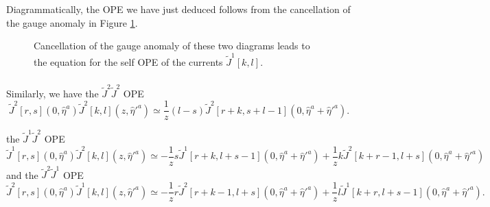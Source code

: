 \documentclass[11pt]{amsart}
\newcommand{\what}{\widehat}
\newcommand{\til}{\widetilde}
\theoremstyle{thm}
\numberwithin{equation}{subsection}
\theoremstyle{def}
\theoremstyle{rem}
\begin{document}
Diagrammatically, the OPE we have just deduced follows from the cancellation of the gauge anomaly in Figure \ref{fig:JJcancel}.


\begin{figure}
	\caption{Cancellation of the gauge anomaly of these two diagrams leads to the equation for the self OPE of the currents $\til{J}^1[k,l]$. \label{fig:JJcancel}}
\end{figure}

\subsubsection{}

Similarly, we have the $\til{J}^2 \til{J}^2$ OPE
\[ 
		\til{J}^2[r,s](0,\what{\eta}^a)  \til{J}^2[k,l](z,\what{\eta}'^{a})  
	\simeq \frac{1}{z} (l-s)  \til{J}^2 [r+k,s+l-1] (0,\what{\eta}^a + \what{\eta}'^{a} ). 
\]

the $\til{J}^1 \til{J}^2$ OPE
\[ 
	\til{J}^1[r,s] (0,\what{\eta}^a) \til{J}^2[k,l](z,\what{\eta}'^{a}) \simeq - \frac{1}{z} s  \til{J}^1[r+k, l+s - 1] (0,\what{\eta}^a + \what{\eta}'^{a})    + \frac{1}{z} k \til{J}^2[k+r-1,l+s] (0,\what{\eta}^a + \what{\eta}'^{a})  
\]
and the $\til{J}^2 \til{J}^1$ OPE
\[ 
	\til{J}^2[r,s] (0,\what{\eta}^a) \til{J}^1[k,l](z,\what{\eta}'^{a}) \simeq - \frac{1}{z} r  \til{J}^2[r+k-1, l+s ] (0,\what{\eta}^a + \what{\eta}'^{a})    + \frac{1}{z} l \til{J}^1[k+r,l+s-1] (0,\what{\eta}^a + \what{\eta}'^{a}).   
\]

\subsubsection{}
\end{document}
